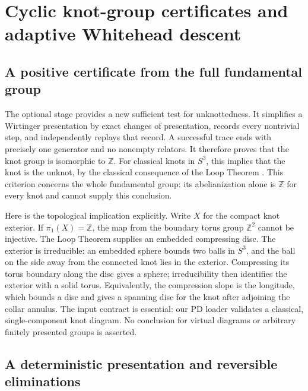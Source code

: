 \section{Cyclic knot-group certificates and adaptive Whitehead descent}
\label{sec:group-certificates}

\subsection{A positive certificate from the full fundamental group}

The optional  stage provides a new sufficient test for
unknottedness.  It simplifies a Wirtinger presentation by exact changes of
presentation, records every nontrivial step, and independently replays that
record.  A successful trace ends with precisely one generator and no
nonempty relators.  It therefore proves that the knot group is isomorphic
to $\mathbb Z$.  For classical knots in $S^3$, this implies that the knot is
the unknot, by the classical consequence of the Loop Theorem
\cite{papakyriakopoulos}.  This criterion concerns the whole fundamental
group: its abelianization alone is $\mathbb Z$ for every knot and cannot
supply this conclusion.

Here is the topological implication explicitly.  Write $X$ for the compact
knot exterior.  If $\pi_1(X)=\mathbb Z$, the map from the boundary torus
group $\mathbb Z^2$ cannot be injective.  The Loop Theorem supplies an
embedded compressing disc.  The exterior is irreducible: an embedded
sphere bounds two balls in $S^3$, and the ball on the side away from the
connected knot lies in the exterior.  Compressing its torus boundary along
the disc gives a sphere; irreducibility then identifies the exterior with
a solid torus.  Equivalently, the compression slope is the longitude,
which bounds a disc and gives a spanning disc for the knot after adjoining
the collar annulus.  The input contract is essential: our PD loader
validates a classical, single-component knot diagram.  No conclusion for
virtual diagrams or arbitrary finitely presented groups is asserted.

\subsection{A deterministic presentation and reversible eliminations}

